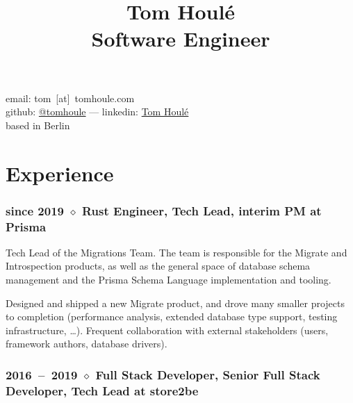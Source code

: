 \documentclass[10pt]{article}
\date{}
\title{Tom Houlé \\ Software Engineer}
\author{}
\newcommand{\setparskip}{\setlength{\parskip}{.3em}}
\begin{document}
\maketitle

\vspace{-14mm}

\begin{center}
email: tom~[at]~tomhoule.com \\
github: \href{https://github.com/tomhoule}{@tomhoule}  --- linkedin: \href{https://www.linkedin.com/in/tom-houl\%C3\%A9-4398135a/}{Tom Houlé} \\
based in Berlin
\end{center}

\vspace{10mm}

\begin{minipage}[t]{0.54\textwidth}
  \setparskip

  \section*{Experience}

  \subsubsection*{since 2019 $\diamond$ Rust Engineer, Tech Lead, interim PM at Prisma}

    \vspace{-0.8em}

    Tech Lead of the Migrations Team. The team is responsible for the Migrate
    and Introspection products, as well as the general space of database schema
    management and the Prisma Schema Language implementation and tooling.

    Designed and shipped a new Migrate product, and drove many smaller projects to completion (performance analysis, extended database type support, testing infrastructure, …). Frequent collaboration with external stakeholders (users, framework authors, database drivers).

    \vspace{-0.5em}

    \subsubsection*{2016~--~2019 $\diamond$ Full Stack Developer, Senior Full Stack Developer, Tech Lead at store2be}

    \vspace{-0.8em}


\end{minipage}
\end{document}
